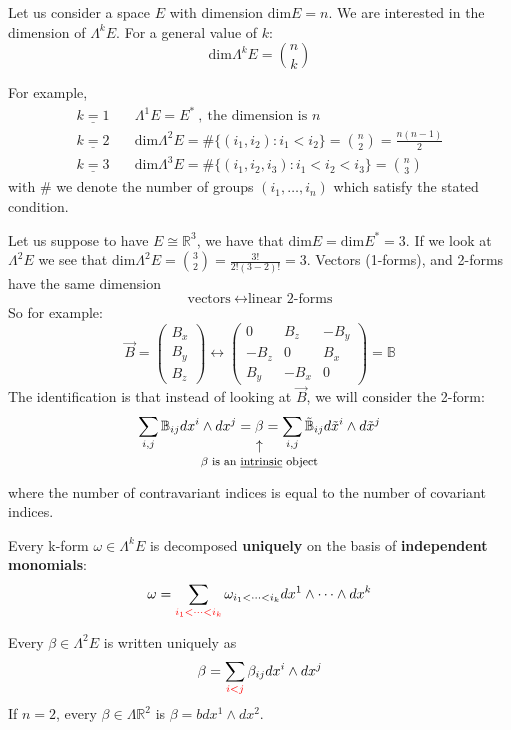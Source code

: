 \documentclass[../main.tex]{subfiles}
\begin{document}
\begin{corollary}
Let us consider a space $E$ with dimension $\textrm{dim}E=n$. We are interested in the dimension of $\Lambda^k E$.
For a general value of $k$: \[\textrm{dim}\Lambda^k E=\binom{n}{k}\]
\end{corollary}
For example,
    \[
    \begin{split}
    \underline{k=1}\quad &\Lambda^1 E=E^\ast\ , \ \textrm{the dimension is }n\\
    \underline{k=2}\quad &\textrm{dim}\Lambda^2 E=\texttt{\#}\{(i_1,i_2):i_1<i_2\}=\binom{n}{2}=\frac{n(n-1)}{2}\\
    \underline{k=3}\quad &\textrm{dim}\Lambda^3 E=\texttt{\#}\{(i_1,i_2,i_3):i_1<i_2<i_3\}=\binom{n}{3}
    \end{split}
    \]
with \# we denote the number of groups $(i_1,\dots,i_n)$ which satisfy the stated condition.
\begin{kaobox}[frametitle=Remark: the miracle of $\mathbb{R}^3$]
Let us suppose to have $E\cong\mathbb{R}^3$, we have that $\textrm{dim}E=\textrm{dim}E^*=3$. If we look at $\Lambda^2 E$ we see that dim$\Lambda^2 E=\binom{3}{2}=\frac{3!}{2!(3-2)!}=3$.
Vectors (1-forms), and 2-forms have the same dimension
\[
\textrm{vectors} \ \longleftrightarrow \textrm{linear 2-forms}
\]
So for example:
\[
\vec{B}=\begin{pmatrix}
B_x\\B_y\\B_z
\end{pmatrix}\longleftrightarrow\begin{pmatrix}
0 & B_z & -B_y\\
-B_z & 0 & B_x\\
B_y & -B_x & 0
\end{pmatrix}=\mathbb{B}
\]
The identification is that instead of looking at $\vec{B}$, we will consider the 2-form:
\[
\sum_{i,j} \mathbb{B}_{ij}dx^i\wedge dx^j=\underset{\mathclap{\tikz \node {$\uparrow$} node [below=1ex] {\footnotesize $\beta$ is an \underline{intrinsic} object};}}{\beta}=\sum_{i,j} \Tilde{\mathbb{B}}_{ij}d\Tilde{x}^i\wedge d\Tilde{x}^j
\]
where the number of contravariant indices is equal to the number of covariant indices.
\end{kaobox}
\begin{corollary}
Every k-form $\omega\in\Lambda^k E$ is decomposed \textbf{uniquely} on the basis of \textbf{independent monomials}:
\[
\omega=\sum_{\color{red}i_1<\dots<i_k}\omega_{i_1<\dots<i_k}dx^1\wedge\dots\wedge dx^k
\]
\end{corollary}
\begin{example}
Every $\beta\in\Lambda^2 E$ is written uniquely as \[
\beta=\sum_{\color{red}i<j}\beta_{ij}dx^i\wedge dx^j
\]
If $n=2$, every $\beta\in\Lambda\mathbb{R}^2$ is $\beta=bdx^1\wedge dx^2$.
\end{example}
\end{document}
